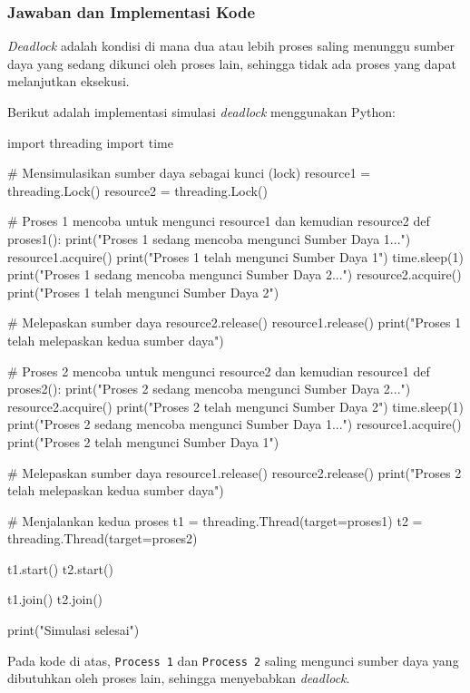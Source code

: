 \documentclass[12pt]{article}
\begin{document}
\subsubsection{Jawaban dan Implementasi Kode}
\textit{Deadlock} adalah kondisi di mana dua atau lebih proses saling menunggu sumber daya yang sedang dikunci oleh proses lain, sehingga tidak ada proses yang dapat melanjutkan eksekusi.

Berikut adalah implementasi simulasi \textit{deadlock} menggunakan Python:

\begin{python}  
import threading
import time

# Mensimulasikan sumber daya sebagai kunci (lock)
resource1 = threading.Lock()
resource2 = threading.Lock()

# Proses 1 mencoba untuk mengunci resource1 dan kemudian resource2
def proses1():
    print("Proses 1 sedang mencoba mengunci Sumber Daya 1...")
    resource1.acquire()
    print("Proses 1 telah mengunci Sumber Daya 1")
    time.sleep(1)
    print("Proses 1 sedang mencoba mengunci Sumber Daya 2...")
    resource2.acquire()
    print("Proses 1 telah mengunci Sumber Daya 2")
    
    # Melepaskan sumber daya
    resource2.release()
    resource1.release()
    print("Proses 1 telah melepaskan kedua sumber daya")

# Proses 2 mencoba untuk mengunci resource2 dan kemudian resource1
def proses2():
    print("Proses 2 sedang mencoba mengunci Sumber Daya 2...")
    resource2.acquire()
    print("Proses 2 telah mengunci Sumber Daya 2")
    time.sleep(1)
    print("Proses 2 sedang mencoba mengunci Sumber Daya 1...")
    resource1.acquire()
    print("Proses 2 telah mengunci Sumber Daya 1")
    
    # Melepaskan sumber daya
    resource1.release()
    resource2.release()
    print("Proses 2 telah melepaskan kedua sumber daya")

# Menjalankan kedua proses
t1 = threading.Thread(target=proses1)
t2 = threading.Thread(target=proses2)

t1.start()
t2.start()

t1.join()
t2.join()

print("Simulasi selesai")
\end{python}

Pada kode di atas, \texttt{Process 1} dan \texttt{Process 2} saling mengunci sumber daya yang dibutuhkan oleh proses lain, sehingga menyebabkan \textit{deadlock}.
\end{document}
